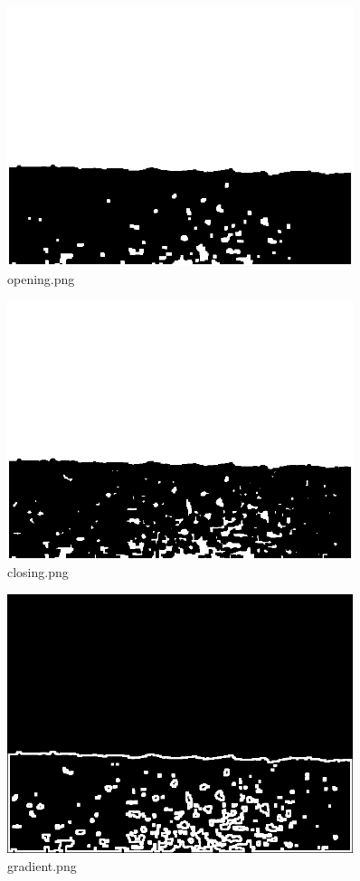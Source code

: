 \documentclass[a4paper,11pt]{article}
\begin{document}
\begin{figure}[p]
	\centering
	\includegraphics[width=0.9\textwidth]{images/morph_transform/opening.png}
	\caption{opening.png}
\end{figure}

\begin{figure}[p]
	\centering
	\includegraphics[width=0.9\textwidth]{images/morph_transform/closing.png}
	\caption{closing.png}
\end{figure}
\clearpage

\begin{figure}[p]
	\centering
	\includegraphics[width=0.9\textwidth]{images/morph_transform/gradient.png}
	\caption{gradient.png}
\end{figure}
\end{document}
